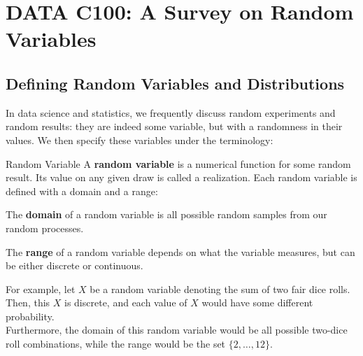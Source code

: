 \chapter{DATA C100: A Survey on Random Variables}

\section{Defining Random Variables and Distributions}
In data science and statistics, we frequently discuss random experiments and random results: they are indeed some variable, but with a randomness in their values. We then specify these variables under the terminology:
\begin{ln-define}{Random Variable}{}
    A \textbf{random variable} is a numerical function for some random result. Its value on any given draw is called a realization.
    Each random variable is defined with a domain and a range:
    \begin{bindenum}
        \item The \textbf{domain} of a random variable is all possible random samples from our random processes.
        \item The \textbf{range} of a random variable depends on what the variable measures, but can be either discrete or continuous.
    \end{bindenum}
\end{ln-define}
For example, let $X$ be a random variable denoting the sum of two fair dice rolls. Then, this $X$ is discrete, and each value of $X$ would have some different probability. \\
Furthermore, the domain of this random variable would be all possible two-dice roll combinations, while the range would be the set $\{2, \dots, 12\}$.


